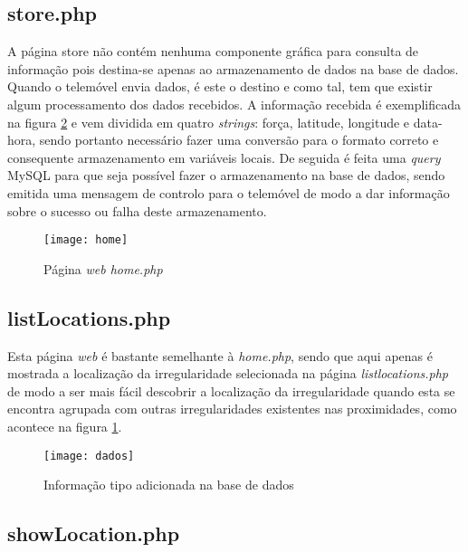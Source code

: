 \subsection{store.php}
\label{sub:store.php}

A página store não contém nenhuma componente gráfica para consulta de informação pois destina-se apenas ao armazenamento de dados na base de dados.
Quando o telemóvel envia dados, é este o destino e como tal, tem que existir algum processamento dos dados recebidos.
A informação recebida é exemplificada na figura \ref{fig:informacao_tipo_adicionada_na_base_de_dados} e vem dividida em quatro \emph{strings}: força, latitude, longitude e data-hora, sendo portanto necessário fazer uma conversão para o formato correto e consequente armazenamento em variáveis locais.
De seguida é feita uma \emph{query} MySQL para que seja possível fazer o armazenamento na base de dados, sendo emitida uma mensagem de controlo para o telemóvel de modo a dar informação sobre o sucesso ou falha deste armazenamento.

\begin{figure}[htp]
	\centering
	\texttt{[image: home]}
	\caption{Página \emph{web home.php}}
	\label{fig:home.php}
\end{figure}

\subsection{listLocations.php}
\label{sub:listlocations.php}

Esta página \emph{web} é bastante semelhante à \emph{home.php}, sendo que aqui apenas é mostrada a localização da irregularidade selecionada na página \emph{listlocations.php} de modo a ser mais fácil descobrir a localização da irregularidade quando esta se encontra agrupada com outras irregularidades existentes nas proximidades, como acontece na figura \ref{fig:home.php}.

\begin{figure}[htbp]
	\centering
	\texttt{[image: dados]}
	\caption{Informação tipo adicionada na base de dados}
	\label{fig:informacao_tipo_adicionada_na_base_de_dados}
\end{figure}

\subsection{showLocation.php}
\label{sub:showLocation.php}


